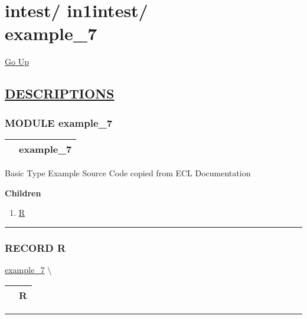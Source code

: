 \chapter*{\color{headfile}
{\large intest\slash\hspace{0pt}}
{\large in1intest\slash\hspace{0pt}}
 \\
example_7
}
\hypertarget{ecldoc:toc:intest.in1intest.example_7}{}
\hyperlink{ecldoc:toc:root/intest/in1intest}{Go Up}


\section*{\underline{\textsf{DESCRIPTIONS}}}
\subsection*{\textsf{\colorbox{headtoc}{\color{white} MODULE}
example\_7}}

\hypertarget{ecldoc:intest.in1intest.example_7}{}

{\renewcommand{\arraystretch}{1.5}
\begin{tabularx}{\textwidth}{|>{\raggedright\arraybackslash}l|X|}
\hline
\hspace{0pt}\mytexttt{\color{red} } & \textbf{example\_7} \\
\hline
\end{tabularx}
}

\par
Basic Type Example Source Code copied from ECL Documentation


\textbf{Children}
\begin{enumerate}
\item \hyperlink{ecldoc:intest.in1intest.example_7.r}{R}
\end{enumerate}

\rule{\linewidth}{0.5pt}

\subsection*{\textsf{\colorbox{headtoc}{\color{white} RECORD}
R}}

\hypertarget{ecldoc:intest.in1intest.example_7.r}{}
\hspace{0pt} \hyperlink{ecldoc:intest.in1intest.example_7}{example_7} \textbackslash 

{\renewcommand{\arraystretch}{1.5}
\begin{tabularx}{\textwidth}{|>{\raggedright\arraybackslash}l|X|}
\hline
\hspace{0pt}\mytexttt{\color{red} } & \textbf{R} \\
\hline
\end{tabularx}
}

\par


\rule{\linewidth}{0.5pt}


